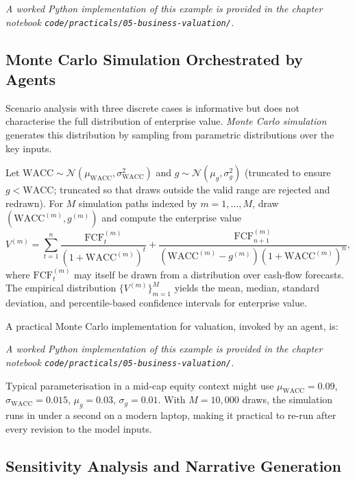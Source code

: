 \begin{deepdive}
\textit{A worked Python implementation of this example is provided in the chapter notebook \texttt{code/practicals/05-business-valuation/}.}

\subsection{Monte Carlo Simulation Orchestrated by Agents}
\label{subsec:bv-scenarios-montecarlo}

Scenario analysis with three discrete cases is informative but does not characterise
the full distribution of enterprise value. \emph{Monte Carlo simulation} generates
this distribution by sampling from parametric distributions over the key inputs.

\begin{definition}
\label{def:monte-carlo-dcf}
Let $\mathrm{WACC} \sim \mathcal{N}(\mu_\mathrm{WACC}, \sigma^2_\mathrm{WACC})$
and $g \sim \mathcal{N}(\mu_g, \sigma^2_g)$ (truncated to ensure $g < \mathrm{WACC}$; truncated so that draws outside the valid range are rejected and redrawn).
For $M$ simulation paths indexed by $m = 1, \ldots, M$, draw
$(\mathrm{WACC}^{(m)}, g^{(m)})$ and compute the enterprise value
\begin{equation}
\label{eq:monte-carlo-ev}
V^{(m)} = \sum_{t=1}^{n} \frac{\mathrm{FCF}_t^{(m)}}{(1+\mathrm{WACC}^{(m)})^t}
+ \frac{\mathrm{FCF}_{n+1}^{(m)}}{(\mathrm{WACC}^{(m)} - g^{(m)})(1+\mathrm{WACC}^{(m)})^n},
\end{equation}
where $\mathrm{FCF}_t^{(m)}$ may itself be drawn from a distribution over
cash-flow forecasts. The empirical distribution $\{V^{(m)}\}_{m=1}^M$ yields
the mean, median, standard deviation, and percentile-based confidence intervals
for enterprise value.
\end{definition}

A practical Monte Carlo implementation for valuation, invoked by an agent, is:

\textit{A worked Python implementation of this example is provided in the chapter notebook \texttt{code/practicals/05-business-valuation/}.}

Typical parameterisation in a mid-cap equity context might use
$\mu_\mathrm{WACC} = 0.09$, $\sigma_\mathrm{WACC} = 0.015$,
$\mu_g = 0.03$, $\sigma_g = 0.01$. With $M = 10{,}000$ draws, the simulation
runs in under a second on a modern laptop, making it practical to re-run after
every revision to the model inputs.

\subsection{Sensitivity Analysis and Narrative Generation}
\label{subsec:bv-scenarios-sensitivity}


\end{deepdive}
